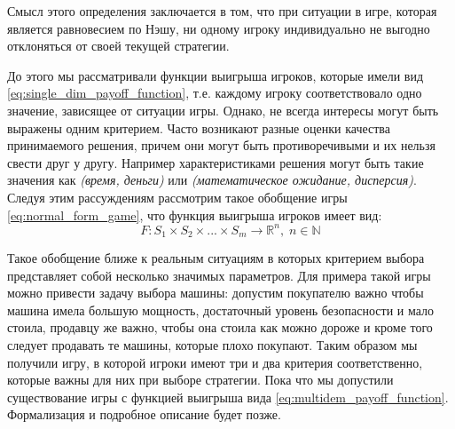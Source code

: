 Смысл этого определения заключается в том, что 
при ситуации в игре, которая является равновесием по Нэшу,
ни одному игроку индивидуально не выгодно отклоняться от своей текущей 
стратегии.

До этого мы рассматривали функции выигрыша 
игроков, которые имели вид
\eqref{eq:single_dim_payoff_function}, т.е. каждому игроку 
соответствовало одно значение, зависящее от ситуации игры.
Однако, не всегда интересы могут быть выражены одним критерием. Часто 
возникают разные оценки качества принимаемого решения, причем они могут 
быть противоречивыми и их нельзя свести друг у другу. Например 
характеристиками решения могут быть такие значения 
как \textit{(время, деньги)} или 
\textit{(математическое ожидание, дисперсия)}. Следуя этим рассуждениям  
рассмотрим такое обобщение игры \eqref{eq:normal_form_game}, что функция
выигрыша игроков имеет вид:
\begin{equation}
	F: S_1 \times S_2 \times ... \times S_m \rightarrow \mathbb R^n
	, \; n \in \mathbb{N}
	\label{eq:multidem_payoff_function}
\end{equation}

Такое обобщение ближе к реальным ситуациям
в которых критерием выбора представляет собой несколько значимых параметров.
Для примера такой игры можно привести задачу выбора машины: 
допустим покупателю важно чтобы машина имела большую мощность, 
достаточный уровень безопасности 
и мало стоила, продавцу же важно, чтобы она стоила как можно дороже и 
кроме того следует продавать те машины, которые плохо покупают. 
Таким образом мы получили игру, в которой игроки имеют три и два критерия
соответственно, которые важны для них при выборе стратегии. 
Пока что мы допустили существование игры с функцией выигрыша
вида \eqref{eq:multidem_payoff_function}. Формализация и подробное 
описание будет позже.

